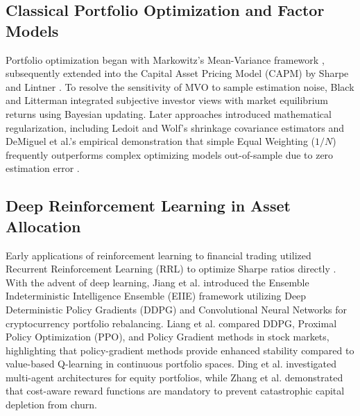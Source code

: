 \documentclass[conference]{IEEEtran}
\begin{document}
\subsection{Classical Portfolio Optimization and Factor Models}
Portfolio optimization began with Markowitz's Mean-Variance framework \cite{markowitz1952portfolio}, subsequently extended into the Capital Asset Pricing Model (CAPM) by Sharpe \cite{sharpe1964capital} and Lintner \cite{lintner1965valuation}. To resolve the sensitivity of MVO to sample estimation noise, Black and Litterman \cite{black1992global} integrated subjective investor views with market equilibrium returns using Bayesian updating. Later approaches introduced mathematical regularization, including Ledoit and Wolf's shrinkage covariance estimators \cite{ledoit2004well} and DeMiguel et al.'s empirical demonstration that simple Equal Weighting ($1/N$) frequently outperforms complex optimizing models out-of-sample due to zero estimation error \cite{demiguel2009optimal}.

\subsection{Deep Reinforcement Learning in Asset Allocation}
Early applications of reinforcement learning to financial trading utilized Recurrent Reinforcement Learning (RRL) to optimize Sharpe ratios directly \cite{moody2001learning}. With the advent of deep learning, Jiang et al. \cite{jiang2017deep} introduced the Ensemble Indeterministic Intelligence Ensemble (EIIE) framework utilizing Deep Deterministic Policy Gradients (DDPG) and Convolutional Neural Networks for cryptocurrency portfolio rebalancing. Liang et al. \cite{liang2018adversarial} compared DDPG, Proximal Policy Optimization (PPO), and Policy Gradient methods in stock markets, highlighting that policy-gradient methods provide enhanced stability compared to value-based Q-learning in continuous portfolio spaces. Ding et al. \cite{ding2020deep} investigated multi-agent architectures for equity portfolios, while Zhang et al. \cite{zhang2020deep} demonstrated that cost-aware reward functions are mandatory to prevent catastrophic capital depletion from churn.
\end{document}
